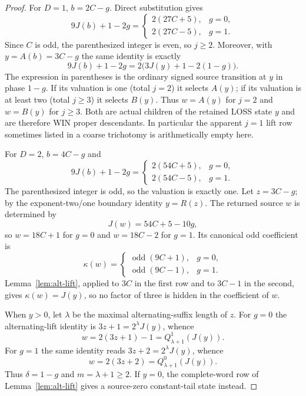 \documentclass[11pt]{article}
\newcommand{\odd}{\operatorname{odd}}
\begin{document}
\begin{proof}
For $D=1$, $b=2C-g$. Direct substitution gives
\[
9J(b)+1-2g=
\begin{cases}
2(27C+5),&g=0,\\
2(27C-5),&g=1.
\end{cases}
\]
Since $C$ is odd, the parenthesized integer is even, so $j\ge2$.  Moreover,
with $y=A(b)=3C-g$ the same identity is exactly
\[
 9J(b)+1-2g
 =2\bigl(3J(y)+1-2(1-g)\bigr).
\]
The expression in parentheses is the ordinary signed source transition at
$y$ in phase $1-g$.  If its valuation is one (total $j=2$) it selects
$A(y)$; if its valuation is at least two (total $j\ge3$) it selects $B(y)$.
Thus $w=A(y)$ for $j=2$ and $w=B(y)$ for $j\ge3$. Both are actual children
of the retained LOSS state $y$ and are therefore WIN proper descendants. In
particular the apparent $j=1$ lift row sometimes listed in a coarse
trichotomy is arithmetically empty here.

For $D=2$, $b=4C-g$ and
\[
9J(b)+1-2g=
\begin{cases}
2(54C+5),&g=0,\\
2(54C-5),&g=1.
\end{cases}
\]
The parenthesized integer is odd, so the valuation is exactly one.  Let
$z=3C-g$; by the exponent-two/one boundary identity $y=R(z)$.  The returned
source $w$ is determined by
\[
 J(w)=54C+5-10g,
\]
so $w=18C+1$ for $g=0$ and $w=18C-2$ for $g=1$.  Its canonical odd
coefficient is
\[
 \kappa(w)=\begin{cases}
 \odd(9C+1),&g=0,\\
 \odd(9C-1),&g=1.
 \end{cases}
\]
Lemma~\ref{lem:alt-lift}, applied to $3C$ in the first row and to $3C-1$ in
the second, gives $\kappa(w)=J(y)$, so no factor of three is hidden in the
coefficient of $w$.

When $y>0$, let $\lambda$ be the maximal alternating-suffix length of $z$.
For $g=0$ the alternating-lift identity is
$3z+1=2^\lambda J(y)$, whence
\[
 w=2(3z+1)-1=Q_{\lambda+1}^{1}(J(y)).
\]
For $g=1$ the same identity reads $3z+2=2^\lambda J(y)$, whence
\[
 w=2(3z+2)=Q_{\lambda+1}^{0}(J(y)).
\]
Thus $\delta=1-g$ and $m=\lambda+1\ge2$.  If $y=0$, the complete-word row of
Lemma~\ref{lem:alt-lift} gives a source-zero constant-tail state instead.
\end{proof}
\end{document}
